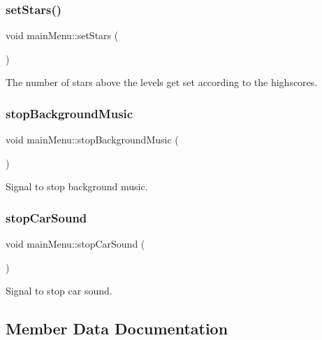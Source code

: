 \subsubsection{\texorpdfstring{setStars()}{setStars()}}
{\footnotesize\ttfamily void main\+Menu\+::set\+Stars (\begin{DoxyParamCaption}{ }\end{DoxyParamCaption})}



The number of stars above the levels get set according to the highscores. 

\mbox{\label{classmain_menu_a75974a4205260cb8ae09f7c7b19fee0f}} 
\subsubsection{\texorpdfstring{stopBackgroundMusic}{stopBackgroundMusic}}
{\footnotesize\ttfamily void main\+Menu\+::stop\+Background\+Music (\begin{DoxyParamCaption}{ }\end{DoxyParamCaption})\hspace{0.3cm}{\ttfamily [signal]}}



Signal to stop background music. 

\mbox{\label{classmain_menu_ad797f58e348ef99487d50084e9366887}} 
\subsubsection{\texorpdfstring{stopCarSound}{stopCarSound}}
{\footnotesize\ttfamily void main\+Menu\+::stop\+Car\+Sound (\begin{DoxyParamCaption}{ }\end{DoxyParamCaption})\hspace{0.3cm}{\ttfamily [signal]}}



Signal to stop car sound. 



\subsection{Member Data Documentation}
\mbox{\label{classmain_menu_a937fbfebe02bf99da1bc6544b3195472}} 
